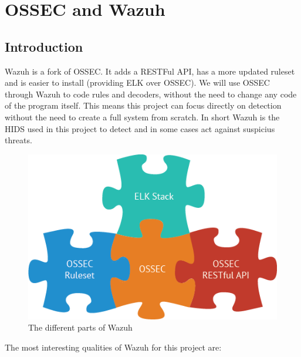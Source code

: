 \section{OSSEC and Wazuh}
\subsection{Introduction}
Wazuh is a fork of OSSEC. It adds a RESTFul API, has a more updated ruleset and is easier to install (providing ELK over OSSEC).
\linej
We will use OSSEC through Wazuh to code rules and decoders, without the need to change any code of the program itself.
This means this project can focus directly on detection without the need to create a full system from scratch.
\linej
In short Wazuh is the HIDS used in this project to detect and in some cases act against suspicius threats.
\begin{figure}[H]
  \centering
	\includegraphics[width=.6\textwidth]{figuras/wazuh_stack.png}
	\caption{The different parts of Wazuh\cite{wazuh_stack}}
\end{figure}
\linej
The most interesting qualities of Wazuh for this project are\cite{wazuh_index}\cite{wazuh_documentation}: %
